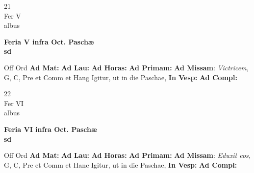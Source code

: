 \documentclass[10pt, openany]{book}
\begin{document}
    \begin{center}
        \begin{minipage}{3.5in}
            \vspace{2em}
            \begin{minipage}{0.5in}
                {\Huge 21} \\
                {\normalsize Fer V} \\
                {\normalsize albus}
            \end{minipage}
            \begin{minipage}{3.0in}
                \textbf{ \large Feria V infra Oct. Paschæ \\
                \textnormal{\normalsize sd}} \\ 
            \end{minipage}
            \begin{justify}Off Ord
                \textbf{Ad Mat: }
                \textbf{Ad Lau: }
                \textbf{Ad Horas: }
                \textbf{Ad Primam: }\textbf{Ad Missam}: \textit{Victricem,} G, C, Pre et Comm et Hang Igitur, ut in die Paschae,  
                \textbf{In Vesp: }
                \textbf{Ad Compl: }
            \end{justify}
        \end{minipage}
    \end{center}

    \begin{center}
        \begin{minipage}{3.5in}
            \vspace{2em}
            \begin{minipage}{0.5in}
                {\Huge 22} \\
                {\normalsize Fer VI} \\
                {\normalsize albus}
            \end{minipage}
            \begin{minipage}{3.0in}
                \textbf{ \large Feria VI infra Oct. Paschæ \\
                \textnormal{\normalsize sd}} \\ 
            \end{minipage}
            \begin{justify}Off Ord
                \textbf{Ad Mat: }
                \textbf{Ad Lau: }
                \textbf{Ad Horas: }
                \textbf{Ad Primam: }\textbf{Ad Missam}: \textit{Eduxit eos,} G, C, Pre et Comm et Hanc Igitur, ut in die Paschae,  
                \textbf{In Vesp: }
                \textbf{Ad Compl: }
            \end{justify}
        \end{minipage}
    \end{center}
\end{document}
